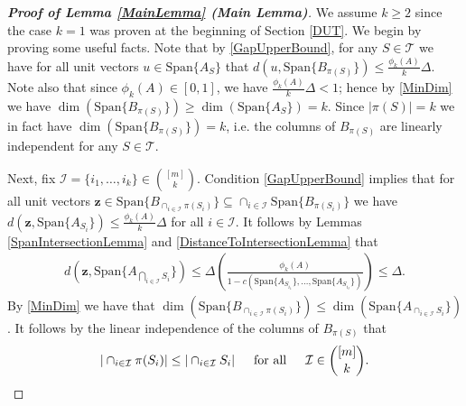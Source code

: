 \documentclass[journal, onecolumn]{IEEEtran}
\begin{document}
\begin{proof}[\textbf{Proof of Lemma \ref{MainLemma} (Main Lemma)}]
We assume $k \geq 2$ since the case $k = 1$ was proven at the beginning of Section \ref{DUT}. We begin by proving some useful facts. Note that by \eqref{GapUpperBound}, for any $S \in \mathcal{T}$ we have for all unit vectors $u \in \text{Span}\{A_S\}$ that $d(u, \text{Span}\{B_{\pi(S)}\}) \leq \frac{\phi_k(A)}{k} \Delta$. Note also that since $\phi_k(A) \in [0,1]$, we have $\frac{\phi_k(A)}{k} \Delta < 1$; hence by \eqref{MinDim} we have $\dim(\text{Span}\{B_{\pi(S)}\}) \geq \dim(\text{Span}\{A_S\}) = k$. Since $|\pi(S)| = k$ we in fact have $\dim(\text{Span}\{B_{\pi(S)}\}) = k$, i.e. the columns of $B_{\pi(S)}$ are linearly independent for any $S \in \mathcal{T}$. 

Next, fix $\mathcal{I} = \{i_1, \ldots, i_k\} \in {[m] \choose k}$. Condition \eqref{GapUpperBound} implies that for all unit vectors $\mathbf{z} \in  \text{Span}\{B_{\cap_{i \in \mathcal{I}}\pi(S_i)}\} \subseteq \cap_{i \in \mathcal{I}} \text{Span}\{B_{\pi(S_i)}\}$ we have $d(\mathbf{z}, \text{Span}\{A_{S_i}\}) \leq \frac{\phi_k(A)}{k} \Delta$ for all $i \in \mathcal{I}$. It follows by Lemmas  \ref{SpanIntersectionLemma} and \ref{DistanceToIntersectionLemma} that 
\begin{align}\label{fact1}
d\left( \mathbf{z}, \text{Span}\{A_{\bigcap_{i \in \mathcal{I}} S_{i}}\} \right) \leq \Delta \left( \frac{\phi_k(A)}{1 - c(\text{Span}\{A_{S_{i_1}}\}, \ldots, \text{Span}\{A_{S_{i_\ell}}\})} \right) \leq \Delta.
\end{align}
%
By \eqref{MinDim} we have that $\dim(\text{Span}\{B_{\cap_{i \in \mathcal{I}}\pi(S_{i})}\}) \leq \dim(\text{Span}\{A_{\cap_{i \in \mathcal{I}} S_{i}}\})$. It follows by the linear independence of the columns of $B_{\pi(S)}$ that
\begin{align}\label{fact2}
|\cap_{i \in \mathcal{I}} \pi(S_{i})| \leq |\cap_{i \in \mathcal{I}} S_{i} | \indent \text{for all} \indent \mathcal{I} \in {[m] \choose k}.
\end{align}


\end{proof}
\end{document}
